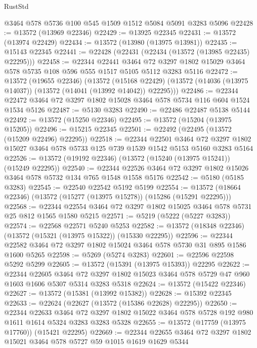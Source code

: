\begin{lexlean}{RustStd}
\begin{coremodule}
    @3464
    @578
    @5736
    @100
    @545
    @1509
    @1512
    @5084
    @5091
    @3283
    @5096
@22428 := @13572 (@13969 @22346)
@22429 := @13925 @22345
@22431 := @13572 (@13974 @22429)
@22434 := @13572 (@13980 (@13975 @13981))
@22435 := @15143 @22345
@22441 := @22428 (@22431 (@22434 (@13572 (@13985 @22435) @22295)))
@22458 := @22344
    @22441
    @3464
    @72
    @3297
    @1802
    @15029
    @3464
    @578
    @5735
    @108
    @596
    @555
    @1517
    @5105
    @5112
    @3283
    @5116
@22472 := @13572
    (@19655 @22346)
    (@13572
      (@15168 @22429)
      (@13572 (@14036 (@13975 @14037)) (@13572 (@14041 (@13992 @14042)) @22295)))
@22486 := @22344 @22472 @3464 @72 @3297 @1802 @15028 @3464 @578 @5734 @116 @604 @1524 @1534 @5126
@22487 := @5130 @3283
@22490 := @22486 @22487 @5138 @5144
@22492 := @13572 (@15250 @22346)
@22495 := @13572 (@15204 (@13975 @15205))
@22496 := @15215 @22345
@22501 := @22492 (@22495 (@13572 (@15209 @22496) @22295))
@22518 := @22344
    @22501
    @3464
    @72
    @3297
    @1802
    @15027
    @3464
    @578
    @5733
    @125
    @739
    @1539
    @1542
    @5153
    @5160
    @3283
    @5164
@22526 := @13572 (@19192 @22346) (@13572 (@15240 (@13975 @15241)) (@15249 @22295))
@22540 := @22344 @22526 @3464 @72 @3297 @1802 @15026 @3464 @578 @5732 @134 @765 @1548 @1558 @5176
@22542 := @5180 (@5185 @3283)
@22545 := @22540 @22542 @5192 @5199
@22554 := @13572 (@18664 @22346) (@13572 (@15277 (@13975 @15278)) (@15286 (@15291 @22295)))
@22568 := @22344 @22554 @3464 @72 @3297 @1802 @15025 @3464 @578 @5731 @25 @812 @1565 @1580 @5215
@22571 := @5219 (@5222 (@5227 @3283))
@22574 := @22568 @22571 @5240 @5253
@22582 := @13572 (@18348 @22346) (@13572 (@15321 (@13975 @15322)) (@15330 @22295))
@22596 := @22344 @22582 @3464 @72 @3297 @1802 @15024 @3464 @578 @5730 @31 @895 @1586 @1600 @5265
@22598 := @5269 (@5274 @3283)
@22601 := @22596 @22598 @5292 @5299
@22605 := @13572 (@15391 (@13975 @15393)) @22295
@22622 := @22344
    @22605
    @3464
    @72
    @3297
    @1802
    @15023
    @3464
    @578
    @5729
    @47
    @960
    @1603
    @1606
    @5307
    @5314
    @3283
    @5318
@22624 := @13572 (@15422 @22346)
@22627 := @13572 (@15381 (@13992 @15382))
@22628 := @15392 @22345
@22633 := @22624 (@22627 (@13572 (@15386 @22628) @22295))
@22650 := @22344
    @22633
    @3464
    @72
    @3297
    @1802
    @15022
    @3464
    @578
    @5728
    @192
    @980
    @1611
    @1614
    @5324
    @3283
    @3283
    @5328
@22655 := @13572 (@17759 (@13975 @17760)) (@15421 @22295)
@22669 := @22344 @22655 @3464 @72 @3297 @1802 @15021 @3464 @578 @5727 @59 @1015 @1619 @1629 @5344

\end{coremodule}
\end{lexlean}
